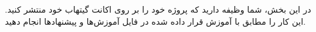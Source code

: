 
در این بخش، شما وظیفه دارید که پروژه خود را بر روی اکانت گیتهاب خود منتشر کنید. این کار را مطابق با آموزش قرار داده شده در فایل آموزش‌ها و پیشنهاد‌ها انجام دهید.